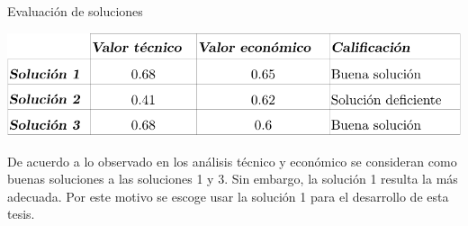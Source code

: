 \begin{table}[htb!]
  \centering
  \caption{Evaluación de soluciones}
  \label{diag:eval_sol}
  \includegraphics[width=0.9\linewidth]{tab_puntaje.pdf}
\end{table}

De acuerdo a lo observado en los análisis técnico y económico se consideran como buenas soluciones a las soluciones 1 y 3. Sin embargo, la solución 1 resulta la más adecuada. Por este motivo se escoge usar la solución 1 para el desarrollo de esta tesis.
